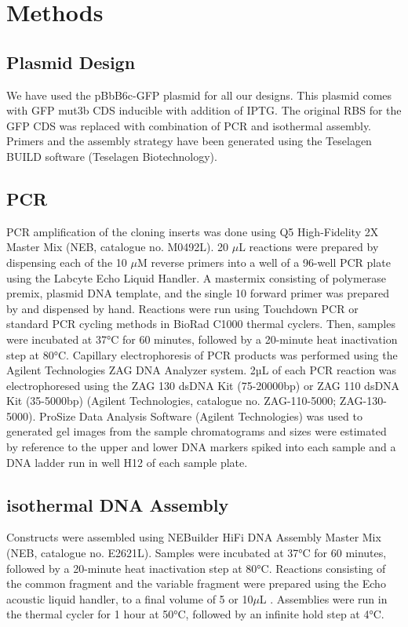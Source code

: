 \section{Methods}

\subsection{Plasmid Design}

We have used the pBbB6c-GFP plasmid for all our designs. This plasmid comes with GFP mut3b CDS inducible with addition of IPTG. The original RBS for the GFP CDS was replaced with combination of PCR and isothermal assembly. Primers and the assembly strategy have been generated using the Teselagen BUILD software (Teselagen Biotechnology).

\subsection{PCR}
PCR amplification of the cloning inserts was done using Q5 High-Fidelity 2X Master Mix (NEB, catalogue no. M0492L). 20 \(\mu\)L reactions were prepared by dispensing each of the 10 \(\mu\)M reverse primers into a well of a 96-well PCR plate using the Labcyte Echo Liquid Handler. A mastermix consisting of polymerase premix, plasmid DNA template, and the single 10 forward primer was prepared by and dispensed by hand. Reactions were run using Touchdown PCR or standard PCR cycling methods in BioRad C1000 thermal cyclers. Then, samples were incubated at 37°C for 60 minutes, followed by a 20-minute heat inactivation step at 80°C.
Capillary electrophoresis of PCR products was performed using the Agilent Technologies ZAG DNA Analyzer system. 2µL of each PCR reaction was electrophoresed using the ZAG 130 dsDNA Kit (75-20000bp) or ZAG 110 dsDNA Kit (35-5000bp) (Agilent Technologies, catalogue no. ZAG-110-5000; ZAG-130-5000). ProSize Data Analysis Software (Agilent Technologies) was used to generated gel images from the sample chromatograms and sizes were estimated by reference to the upper and lower DNA markers spiked into each sample and a DNA ladder run in well H12 of each sample plate. 

\subsection{isothermal DNA Assembly}
Constructs were assembled using NEBuilder HiFi DNA Assembly Master Mix (NEB, catalogue no. E2621L). Samples were incubated at 37°C for 60 minutes, followed by a 20-minute heat inactivation step at 80°C. Reactions consisting of the common fragment and the variable fragment were prepared using the Echo acoustic liquid handler, to a final volume of 5 or 10\(\mu\)L . Assemblies were run in the thermal cycler for 1 hour at 50°C, followed by an infinite hold step at 4°C.

